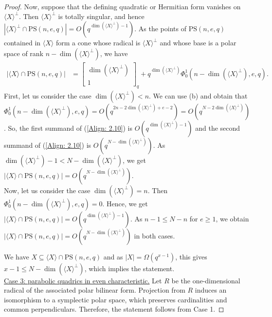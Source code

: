 \documentclass[10pt,a4paper]{amsart}
\newcommand{\Gauss}[2]{{\begin{bmatrix} #1 \\ #2 \end{bmatrix}_q}}
\newcommand{\PS}{\mathrm{PS}}
\renewcommand{\geq}{\geqslant}
\renewcommand{\leq}{\leqslant}
\begin{document}
\begin{proof}
Now, suppose that the defining quadratic or Hermitian form vanishes on $\langle X\rangle^\perp$. Then $\langle X\rangle^\perp$ is totally singular, and hence $|\langle X\rangle^\perp\cap\PS(n,e,q)|=O(q^{\dim(\langle X\rangle^\perp)-1})$.
As the points of $\PS(n,e,q)$ contained in $\langle X\rangle$ form a cone whose radical is $\langle X\rangle^\perp$ and whose base is a polar space of rank $n-\dim(\langle X\rangle^\perp)$, we have 
\begin{align} \label{Align: 2.10}
    |\langle X\rangle\cap\PS(n,e,q)|&=\Gauss{\dim(\langle X\rangle^\perp)}{1}+
    q^{\dim(\langle X\rangle^\perp)}
    \Phi_0^1(n-\dim(\langle X\rangle^\perp),e,q). %
\end{align}
First, let us consider the case $\dim(\langle X\rangle^\perp)<n$.
We can use  (b) and obtain that $\Phi_0^1(n-\dim(\langle X\rangle^\perp),e,q)=O(q^{2n-2\dim(\langle X\rangle^\perp)+e-2})=O(q^{N-2\dim(\langle X\rangle^\perp)})$. So, the first summand of (\ref{Align: 2.10}) is  $O(q^{\dim(\langle X\rangle^\perp)-1})$ and the second summand of (\ref{Align: 2.10}) is $O(q^{N-\dim(\langle X\rangle^\perp)})$. As $\dim(\langle X\rangle^\perp)-1<N-\dim(\langle X\rangle^\perp)$, we get $|\langle X\rangle\cap\PS(n,e,q)|=O(q^{N-\dim(\langle X\rangle^\perp)})$.\\
Now, let us consider the case $\dim(\langle X\rangle^\perp)=n$. Then $\Phi_0^1(n-\dim(\langle X\rangle^\perp),e,q)=0$.  Hence, we get $|\langle X\rangle\cap\PS(n,e,q)|=O(q^{\dim(\langle X\rangle^\perp)-1})$. As $n-1\leq N-n$ for $e\geq 1$, we obtain $|\langle X\rangle\cap\PS(n,e,q)|=O(q^{N-\dim(\langle X\rangle^\perp)})$ in both cases.

We have $X\subseteq \langle X \rangle\cap \PS(n,e,q)$ and as $|X|=\Omega(q^{x-1})$, this gives $x-1\leq N-\dim(\langle X\rangle^\perp)$, which implies the statement.\\

\underline{Case 3: parabolic quadrics in even characteristic.}
Let $R$ be the one-dimensional radical of the associated polar bilinear form. Projection from $R$ induces an isomorphism to a symplectic polar space, which preserves cardinalities and common perpendiculars.
Therefore, the statement follows from Case 1.
\end{proof}
\end{document}

